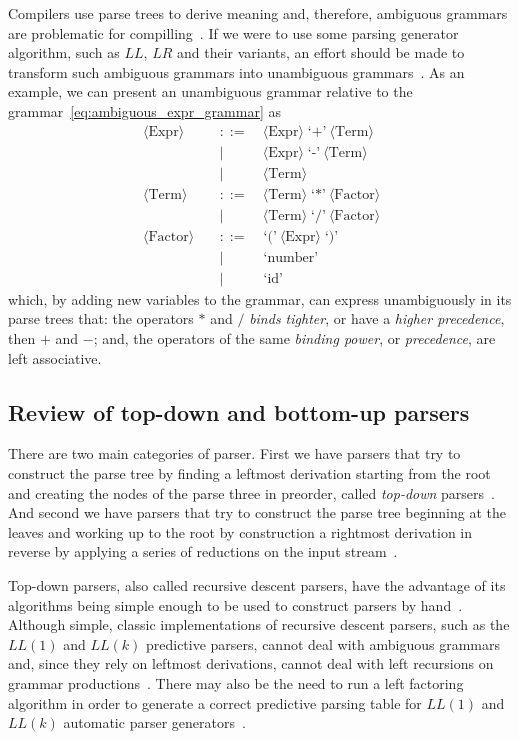 \documentclass[
  oneside,
  english,
  coorientadorbanca,
  embeddedlogo,
  noabntexcite
]{ufsc-thesis-rn46-2019}
\newcommand{\bnfvar}[1]{\ \bnfvars{#1}}
\newcommand{\bnfvars}[1]{\langle\textrm{#1}\rangle}
\newcommand{\bnfter}[1]{\;\bnfters{#1}}
\newcommand{\bnfters}[1]{\textrm{`}\textrm{#1}\textrm{'}}
\newcommand{\bnfprod}[2]{\bnfvars{#1} &\ &::= & #2}
\newcommand{\bnfmore}[1]{ && \mid{} & #1}
\begin{document}
Compilers use parse trees to derive meaning and, therefore, ambiguous grammars are problematic for compilling~\cite{appel2003modern}.
If we were to use some parsing generator algorithm, such as $LL$, $LR$ and their variants, an effort should be made to transform such ambiguous grammars into unambiguous grammars~\cite{appel2003modern}.
As an example, we can present an unambiguous grammar relative to the grammar~\eqref{eq:ambiguous_expr_grammar} as
\begin{equation}~\label{eq:unambiguous_expr_grammar}
  \begin{alignedat}{2}
    \bnfprod{Expr}{\bnfvar{Expr} \bnfter{+} \bnfvar{Term}} \\
    \bnfmore{\bnfvar{Expr}\bnfter{-}\bnfvar{Term}} \\
    \bnfmore{\bnfvar{Term}} \\
    \bnfprod{Term}{\bnfvar{Term} \bnfter{*} \bnfvar{Factor}} \\
    \bnfmore{\bnfvar{Term}\bnfter{/}\bnfvar{Factor}} \\
    \bnfprod{Factor}{\bnfter{(}\bnfvar{Expr}\bnfter{)}} \\
    \bnfmore{\bnfter{number}} \\
    \bnfmore{\bnfter{id}}
  \end{alignedat}
\end{equation}
which, by adding new variables to the grammar, can express unambiguously in its parse trees that: the operators $*$ and $/$ \textit{binds tighter}, or have a \textit{higher precedence}, then $+$ and $-$; and, the operators of the same \textit{binding power}, or \textit{precedence}, are left associative.

\subsection{Review of top-down and bottom-up parsers}
There are two main categories of parser.
First we have parsers that try to construct the parse tree by finding a leftmost derivation starting from the root and creating the nodes of the parse three in preorder, called \textit{top-down} parsers~\cite{Aho:2006:CPT:1177220}.
And second we have parsers that try to construct the parse tree beginning at the leaves and working up to the root by construction a rightmost derivation in reverse by applying a series of reductions on the input stream~\cite{Aho:2006:CPT:1177220}.

Top-down parsers, also called recursive descent parsers, have the advantage of its algorithms being simple enough to be used to construct parsers by hand~\cite{appel2003modern}.
Although simple, classic implementations of recursive descent parsers, such as the $LL(1)$ and $LL(k)$ predictive parsers, cannot deal with ambiguous grammars and, since they rely on leftmost derivations, cannot deal with left recursions on grammar productions~\cite{Aho:2006:CPT:1177220}.
There may also be the need to run a left factoring algorithm in order to generate a correct predictive parsing table for $LL(1)$ and $LL(k)$ automatic parser generators~\cite{Aho:2006:CPT:1177220}.
\end{document}
